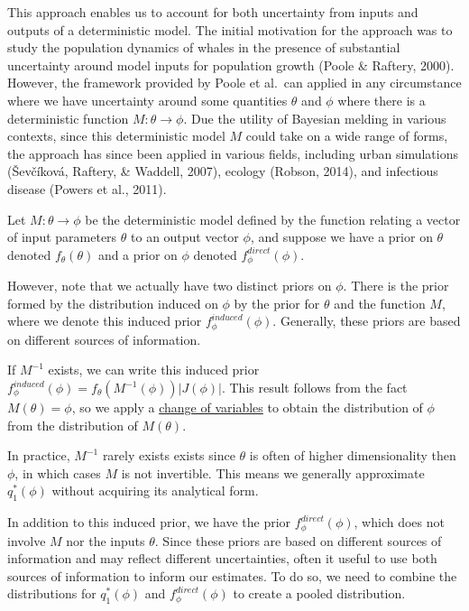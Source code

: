 \documentclass[12pt,twoside]{smiththesis}
\begin{document}
This approach enables us to account for both uncertainty from inputs and outputs of a deterministic model. The initial motivation for the approach was to study the population dynamics of whales in the presence of substantial uncertainty around model inputs for population growth (Poole \& Raftery, 2000). However, the framework provided by Poole et al.~can applied in any circumstance where we have uncertainty around some quantities \(\theta\) and \(\phi\) where there is a deterministic function \(M:\theta \to\phi\). Due the utility of Bayesian melding in various contexts, since this deterministic model \(M\) could take on a wide range of forms, the approach has since been applied in various fields, including urban simulations (Ševčíková, Raftery, \& Waddell, 2007), ecology (Robson, 2014), and infectious disease (Powers et al., 2011).

Let \(M: \theta \to \phi\) be the deterministic model defined by the function relating a vector of input parameters \(\theta\) to an output vector \(\phi\), and suppose we have a prior on \(\theta\) denoted \(f_\theta(\theta)\) and a prior on \(\phi\) denoted \(f_\phi^{direct}(\phi)\).

However, note that we actually have two distinct priors on \(\phi\). There is the prior formed by the distribution induced on \(\phi\) by the prior for \(\theta\) and the function \(M\), where we denote this induced prior \(f_\phi^{induced}(\phi)\). Generally, these priors are based on different sources of information.

If \(M^{-1}\) exists, we can write this induced prior \(f_\phi^{induced}(\phi) = f_\theta(M^{-1}(\phi)) |J(\phi)|\). This result follows from the fact \(M(\theta) = \phi\), so we apply a \href{https://en.wikipedia.org/wiki/Probability_density_function\#Function_of_random_variables_and_change_of_variables_in_the_probability_density_function}{change of variables} to obtain the distribution of \(\phi\) from the distribution of \(M(\theta)\).

In practice, \(M^{-1}\) rarely exists exists since \(\theta\) is often of higher dimensionality then \(\phi\), in which cases \(M\) is not invertible. This means we generally approximate \(q^*_1(\phi)\) without acquiring its analytical form.

In addition to this induced prior, we have the prior \(f_\phi^{direct}(\phi)\), which does not involve \(M\) nor the inputs \(\theta\). Since these priors are based on different sources of information and may reflect different uncertainties, often it useful to use both sources of information to inform our estimates. To do so, we need to combine the distributions for \(q^*_1(\phi)\) and \(f_\phi^{direct}(\phi)\) to create a pooled distribution.
\end{document}

